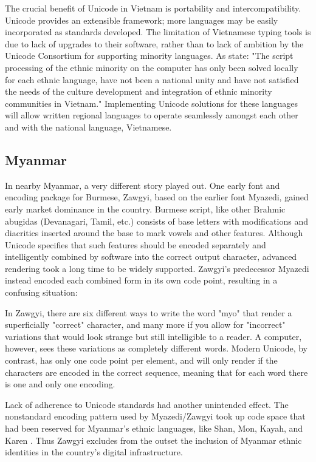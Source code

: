 The crucial benefit of Unicode in Vietnam is portability and
intercompatibility. Unicode provides an extensible framework; more languages may
be easily incorporated as standards developed. The limitation of Vietnamese
typing tools is due to lack of upgrades to their software, rather than to lack
of ambition by the Unicode Consortium for supporting minority languages. As
\textcite{my13} state: "The script processing of the ethnic minority on the
computer has only been solved locally for each ethnic language, have not been a
national unity and have not satisfied the needs of the culture development and
integration of ethnic minority communities in Vietnam." Implementing Unicode
solutions for these languages will allow written regional languages to operate
seamlessly amongst each other and with the national language, Vietnamese.

\subsection{Myanmar}

In nearby Myanmar, a very different story played out. One early font and
encoding package for Burmese, Zawgyi, based on the earlier font Myazedi, gained
early market dominance in the country. Burmese script, like other Brahmic
abugidas (Devanagari, Tamil, etc.) consists of base letters with modifications
and diacritics inserted around the base to mark vowels and other features.
Although Unicode specifies that such features should be encoded separately and
intelligently combined by software into the correct output character, advanced
rendering took a long time to be widely supported. Zawgyi's predecessor Myazedi
instead encoded each combined form in its own code point, resulting in a
confusing situation:

\begin{aquote}{\parencite{hotchkiss16}}
In Zawgyi, there are six different ways to write the word "myo" that render a
superficially "correct" character, and many more if you allow for "incorrect"
variations that would look strange but still intelligible to a reader. A
computer, however, sees these variations as completely different words. Modern
Unicode, by contrast, has only one code point per element, and will only render
if the characters are encoded in the correct sequence, meaning that for each
word there is one and only one encoding.
\end{aquote}

Lack of adherence to Unicode standards had another unintended effect. The
nonstandard encoding pattern used by Myazedi/Zawgyi took up code space that had
been reserved for Myanmar's ethnic languages, like Shan, Mon, Kayah, and Karen
\parencite{hotchkiss16}. Thus Zawgyi excludes from the outset the inclusion of
Myanmar ethnic identities in the country's digital infrastructure.

